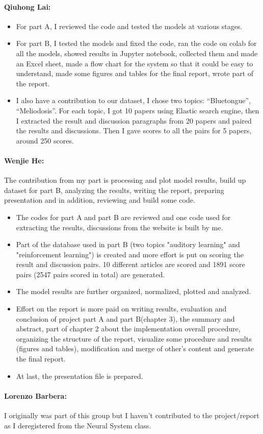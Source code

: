 \paragraph{Qiuhong Lai:}
\begin{itemize}
	\item For part A, I reviewed the code and tested the models at various stages.
	\item For part B, I tested the models and fixed the code, ran the code on colab for all the models, showed results in Jupyter notebook, collected them and made an Excel sheet, made a flow chart for the system so that it could be easy to understand, made some figures and tables for the final report, wrote part of the report. 
	\item I also have a contribution to our dataset, I chose two topics: “Bluetongue”, “Meliodosis”. 
	For each topic, I got 10 papers using Elastic search engine, then I extracted the result and discussion paragraphs from 20 papers and paired the results and discussions. Then I gave scores to all the pairs for 5 papers, around 250 scores.
\end{itemize}	

\paragraph{Wenjie He:}
The contribution from my part is processing and plot model results, build up dataset for part B, analyzing the results, writing the report, preparing presentation and in addition, reviewing and build some code.
\begin{itemize}
	\item The codes for part A and part B are reviewed and one code used for extracting the results, discussions from the website is built by me.		
	\item Part of the database used in part B (two topics "auditory learning" and "reinforcement learning") is created and more effort is put on scoring the result and discussion pairs. 10 different articles are scored and 1891 score pairs (2547 pairs scored in total) are generated.
	\item The model results are further organized, normalized, plotted and analyzed.
	\item Effort on the report is more paid on writing results, evaluation and conclusion of project part A and part B(chapter 3), the summary and abstract, part of chapter 2 about the implementation overall procedure, organizing the structure of the report, visualize some procedure and results (figures and tables), modification and merge of other's content and generate the final report.
	\item At last, the presentation file is prepared.
\end{itemize}

\paragraph{Lorenzo Barbera:}
I originally was part of this group but I haven't contributed to the project/report as I deregistered from the Neural System class.

